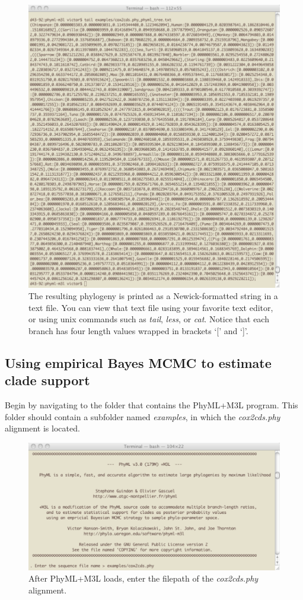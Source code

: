\documentclass[11pt]{article}
\begin{document}
\begin{figure}[p]
\centering
\includegraphics[width=5.5 in]{GRAPHICS/a16.pdf}
\caption{The resulting phylogeny is printed as a Newick-formatted string in a text file.  You can view that text file using your favorite text editor, or using unix commands such as \textit{tail}, \textit{less}, or \textit{cat}.  Notice that each branch has four length values wrapped in brackets `[' and `]'.}
\end{figure}
\clearpage

\pagebreak
\subsection{Using empirical Bayes MCMC to estimate clade support}

Begin by navigating to the folder that contains the PhyML+M3L program.  This folder should contain a subfolder named \textit{examples}, in which the \textit{cox2cds.phy} alignment is located.

\begin{figure}[h]
\centering
\includegraphics[width=5.5 in]{GRAPHICS/a1.pdf}
\caption{After PhyML+M3L loads, enter the filepath of the \textit{cox2cds.phy} alignment.}
\end{figure}
\clearpage
\end{document}
